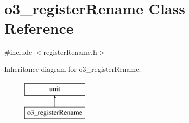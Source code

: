 \hypertarget{classo3__registerRename}{
\section{o3\_\-registerRename Class Reference}
\label{classo3__registerRename}
}


{\ttfamily \#include $<$registerRename.h$>$}

Inheritance diagram for o3\_\-registerRename:\begin{figure}[H]
\begin{center}
\leavevmode
\includegraphics[height=2.000000cm]{classo3__registerRename}
\end{center}
\end{figure}
